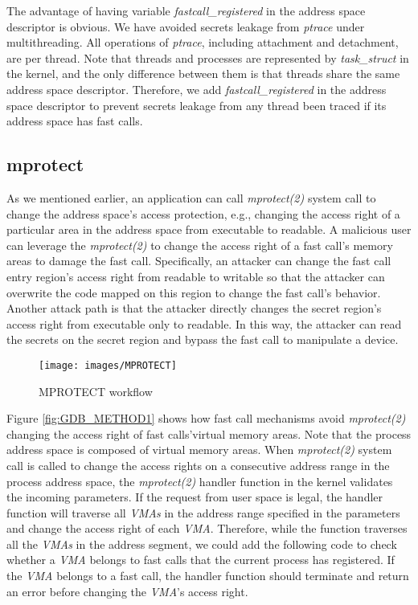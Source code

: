  The advantage of having variable \emph{fastcall\_registered} in the address space 
 descriptor is obvious.  We have avoided secrets leakage from \emph{ptrace} under 
 multithreading. All operations of \emph{ptrace}, including attachment and detachment, 
 are per thread. Note that threads and processes are represented by \emph{task\_struct}
 in the kernel, and the only difference between them is that threads share 
the same address space descriptor. Therefore, we add \emph{fastcall\_registered} 
in the address space descriptor to prevent secrets leakage from any thread 
been traced if its address space has fast calls.


\subsection{mprotect}
As we mentioned earlier, an application can call \emph{mprotect(2)}  
system call to change the address space's access protection, 
e.g., changing the access right of a particular area in the address 
space from executable to readable.  A malicious user can leverage the 
\emph{mprotect(2)} to change the access right of a fast call's memory areas to 
damage the fast call. Specifically, an attacker can change the fast 
call entry region's access right from readable to writable so that the attacker can overwrite 
the code mapped on this region to change the fast call's behavior. 
Another attack path is that the attacker directly changes the secret 
region's access right from executable only to readable. In this way, 
the attacker can read the secrets on the secret region and bypass the 
fast call to manipulate a device.
\begin{figure}[H]
  \centering
  \texttt{[image: images/MPROTECT]}
  \caption[Short description]{MPROTECT workflow}
  \label{fig:MPROTECT}
\end{figure}

Figure \ref{fig:GDB_METHOD1} shows how fast call mechanisms avoid \emph{mprotect(2)} 
changing the access right of fast calls'virtual memory areas. 
Note that the process address space is composed of virtual memory areas.  
When \emph{mprotect(2)} system call is called to change the access rights on a 
consecutive address range in the process address space, the \emph{mprotect(2)} 
handler function in the kernel validates the incoming parameters. 
If the request from user space is legal, the handler function will 
traverse all \emph{VMAs} in the address range specified in the parameters
 and change the access right of each \emph{VMA}. Therefore, while the function 
 traverses all the \emph{VMAs} in the address segment, we could add the following 
 code to check whether a \emph{VMA} belongs to fast calls that the current process 
 has registered. If the \emph{VMA} belongs to a fast call, the handler function 
 should terminate and return an error before changing the \emph{VMA}'s access right.

